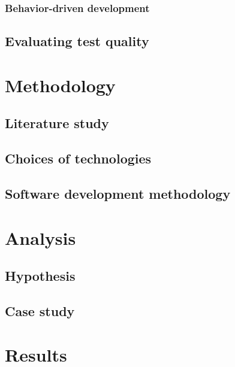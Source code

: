 \documentclass[a4paper]{report}
\begin{document}
    \subsection{Behavior-driven development}
    \label{sec:bdd}
    


  \section{Evaluating test quality}
    \label{sec:quality}
    


\chapter{Methodology}

  

  \section{Literature study}
  

  \section{Choices of technologies}
  

  \section{Software development methodology}
  


\chapter{Analysis}

  

  \section{Hypothesis}
  \label{sec:hypothesis}
  

  \section{Case study}
  


\chapter{Results}
\label{chap:results}
\end{document}
